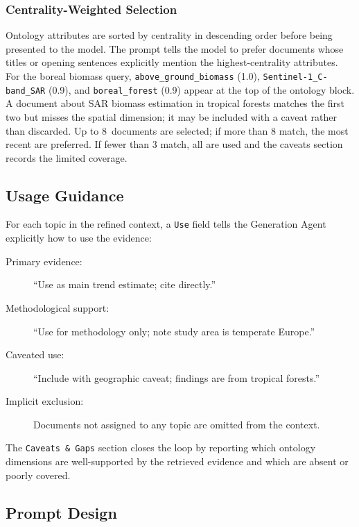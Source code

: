 \subsubsection{Centrality-Weighted Selection}
\label{subsubsec:centrality-matching}

Ontology attributes are sorted by centrality in descending order before being presented to the model. The prompt tells the model to prefer documents whose titles or opening sentences explicitly mention the highest-centrality attributes. For the boreal biomass query, \texttt{above\_ground\_biomass} (1.0), \texttt{Sentinel-1\_C-band\_SAR} (0.9), and \texttt{boreal\_forest} (0.9) appear at the top of the ontology block. A document about SAR biomass estimation in tropical forests matches the first two but misses the spatial dimension; it may be included with a caveat rather than discarded. Up to 8~documents are selected; if more than 8 match, the most recent are preferred. If fewer than 3 match, all are used and the caveats section records the limited coverage.

\subsection{Usage Guidance}
\label{subsec:usage-guidance}

For each topic in the refined context, a \texttt{Use} field tells the Generation Agent explicitly how to use the evidence:

\begin{description}
\item[Primary evidence:] ``Use as main trend estimate; cite directly.''
\item[Methodological support:] ``Use for methodology only; note study area is temperate Europe.''
\item[Caveated use:] ``Include with geographic caveat; findings are from tropical forests.''
\item[Implicit exclusion:] Documents not assigned to any topic are omitted from the context.
\end{description}

The \texttt{Caveats \& Gaps} section closes the loop by reporting which ontology dimensions are well-supported by the retrieved evidence and which are absent or poorly covered.

\subsection{Prompt Design}
\label{subsec:refinement-prompt-design}

